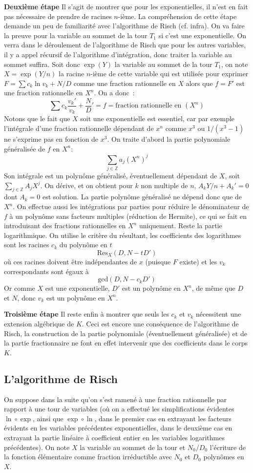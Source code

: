 \documentclass[a4paper,11pt]{article}
\newcommand{\Z}{{\mathbb{Z}}}
\begin{document}
{\bf Deuxième étape}
Il s'agit de montrer que pour les exponentielles, il n'est en fait pas
nécessaire de prendre de racines $n$-ième. La compréhension
de cette étape demande
un peu de familiarité avec l'algorithme de Risch (cf. infra).
On va faire la preuve pour la variable au sommet de la tour $T_1$ si
c'est une exponentielle. On verra dans le déroulement
de l'algorithme de Risch que pour les autres variables, il y a
appel récursif de l'algorithme d'intégration, donc traiter
la variable au sommet suffira.
Soit donc $\exp(Y)$ la variable au sommet de la tour $T_1$, on note
$X=\exp(Y/n)$ la racine $n$-ième de cette variable qui est utilisée
pour exprimer $F=\sum c_k \ln v_k + N/D$ comme une fraction
rationnelle en $X$ alors que $f=F'$ est une fraction rationnelle en $X^n$.
On a donc~:
\[ \sum c_k \frac{v_k'}{v_k} + \frac{N}{D}' 
=f=\mbox{fraction rationnelle en }(X^n) \]
Notons que le fait que $X$ soit une exponentielle est essentiel, 
car par exemple l'intégrale d'une fraction rationnelle dépendant de $x^n$ 
comme $x^3$ ou $1/(x^3-1)$ ne s'exprime pas en fonction de $x^3$.
On traite d'abord la partie polynomiale généralisée de $f$ en $X^n$:
\[ \sum_{j\in \Z} a_j (X^n)^j\]
Son intégrale est un polynôme généralisé, éventuellement dépendant
de $X$, soit $\sum_{j\in \Z} A_j X^j$. On dérive, et on obtient
pour $k$ non multiple de $n$, $A_k Y/n+A_k'=0$ dont $A_k=0$ est
solution. La partie polynôme généralisé ne dépend donc que de $X^n$.
On effectue aussi les intégrations par parties pour réduire le 
dénominateur de $f$ à un polynôme sans facteurs multiples (réduction
de Hermite), ce qui se fait en introduisant des fractions rationnelles 
en $X^n$ uniquement. Reste la partie logarithmique. On utilise le critère
du résultant, les coefficients des logarithmes sont les racines 
$c_k$ du polynôme en $t$
\[ \mbox{Res}_X (D,N-tD') \]
où ces racines doivent être indépendantes de $x$ (puisque $F$ existe)
et les $v_k$ correspondants sont égaux à
\[ \mbox{gcd}(D,N-c_k D') \]
Or comme $X$ est une exponentielle, $D'$ est un polynôme en
$X^n$, de même que $D$ et $N$, donc $v_k$ est un polynôme
en $X^n$.

{\bf Troisième étape}
Il reste enfin à montrer que seuls les $c_k$ et $v_k$ nécessitent
une extension algébrique de $K$. Ceci est encore une cons\'equence
de l'algorithme de Risch, la construction
de la partie polynomiale (éventuellement généralisée) et de la 
partie fractionnaire ne font en effet intervenir que des coefficients
dans le corps $K$.

\subsection{L'algorithme de Risch} \label{sec:risch}
On suppose dans la suite qu'on s'est ramené à une fraction rationnelle
par rapport à une tour de variables (où on a effectué les simplifications
évidentes $\ln \circ \exp$, ainsi que $\exp \circ \ln$, dans le
premier cas en extrayant les facteurs évidents en les variables
précédentes exponentielles, dans le deuxième cas en extrayant la
partie linéaire à coefficient entier en les variables logarithmes
précédentes).
On note $X$ la variable au sommet de la tour et $N_0/D_0$ l'écriture
de la fonction élémentaire comme fraction irréductible avec
$N_0$ et $D_0$ polynômes en $X$.
\end{document}
